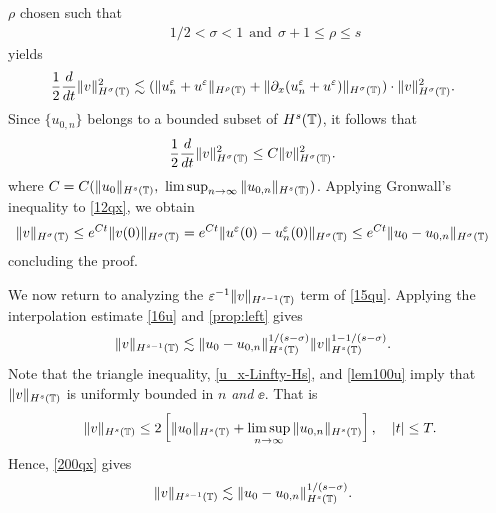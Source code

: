 $\rho$ chosen such that
%
%
\begin{equation}
\label{size_of_sigma'}
\begin{split}
	& 1/2 < \sigma < 1 \ \ \text{and} \ \  \sigma + 1 \le \rho \le s
\end{split}
\end{equation}
%
%
yields
%
%
\begin{equation*}
\begin{split}
\frac{1}{2}\frac{d}{dt} \|v\|_{H^\sigma(\mathbb{T})}^2
& \lesssim
(\|u^{\varepsilon}_n + u^\varepsilon \|_{H^{\rho}(\mathbb{T})} +
\|\partial_x(u^{\varepsilon}_n + u^\varepsilon) \|_{H^\sigma(\mathbb{T})})
\cdot \|v\|_{H^\sigma(\mathbb{T})}^2.
\end{split}
\end{equation*}
%
%
Since $\{u_{0,n}\}$ belongs to a bounded subset of $H^s(\mathbb{T})$, it follows that %
%
\begin{equation}
\begin{split}
\label{12qx}
\frac{1}{2}\frac{d}{dt} \|v\|_{H^{\sigma}(\mathbb{T})}^2
& \le
C \|v\|_{H^{\sigma}(\mathbb{T})}^2.
\end{split}
\end{equation}
%
%
where $C = C(\|u_0\|_{H^s(\mathbb{T})}, \ \limsup_{n \to \infty} 
\|u_{0,n}\|_{H^s(\mathbb{T})})$. 
Applying Gronwall's inequality to \eqref{12qx}, we obtain
%
%
\begin{equation*}
\begin{split}
\|v\|_{H^{\sigma}(\mathbb{T})}
& \le e^{C t}\|v(0)\|_{H^{\sigma}(\mathbb{T})}
= e^{C t}\|u^\varepsilon(0) - u^\varepsilon_n(0) \|_{H^{\sigma}(\mathbb{T})} \le e^{C t} \|u_0 - 
u_{0,n}\|_{H^\sigma(\mathbb{T})}
\end{split}
\end{equation*}
%
%
concluding the proof. \qquad \qedsymbol
%
%
%

We now return to analyzing the $\varepsilon^{-1}
\|v\|_{H^{s-1}(\mathbb{T})}$ term of \eqref{15qu}.
Applying the 
interpolation estimate \eqref{16u} and
\cref{prop:left} gives
%
%
%
%
\begin{equation}
\begin{split}
\label{200qx}
\|v\|_{H^{s-1}(\mathbb{T})} 
& \lesssim  
\|u_0-u_{0,n}\|_{H^s(\mathbb{T})}^{1/(s-\sigma)}\|v\|_{H^s(\mathbb{T})}^{1- 
1/(s-\sigma)}.
\end{split}
\end{equation}
%
%
%
Note that the triangle inequality, \eqref{u_x-Linfty-Hs},
and \eqref{lem100u} 
imply that $\|v\|_{H^s(\mathbb{T})}$ is uniformly bounded in $n$ \emph{and} $\ee$. 
That is
%
%
\begin{equation*}
\begin{split}
	\|v\|_{H^s(\mathbb{T})} \le 2 \left[ \|u_0 \|_{H^s(\mathbb{T})} + \limsup_{n \to 
	\infty} 
	\|u_{0,n}\|_{H^s(\mathbb{T})} 
\right], \quad |t| \le T.
\label{growth_v}
\end{split}
\end{equation*}
%
%
Hence, \eqref{200qx} gives
%
%
\begin{equation}
\begin{split}
\label{200qxr}
\|v\|_{H^{s-1}(\mathbb{T})} 
& \lesssim  
\|u_0-u_{0,n}\|_{H^s(\mathbb{T})}^{1/(s-\sigma)}.
\end{split}
\end{equation}


